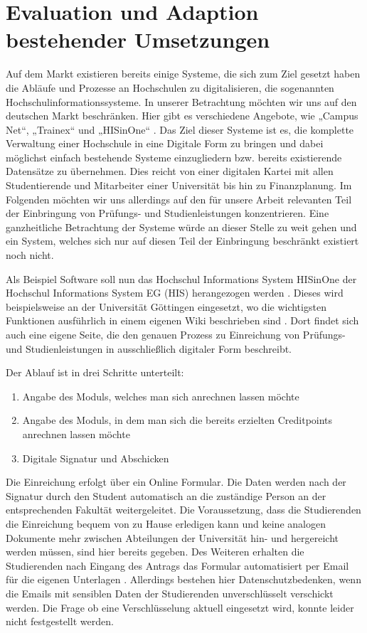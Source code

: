 \section{Evaluation und Adaption bestehender Umsetzungen}

Auf dem Markt existieren bereits einige Systeme, die sich zum Ziel gesetzt haben die Abläufe und Prozesse an Hochschulen zu digitalisieren, die sogenannten Hochschulinformationssysteme. In unserer Betrachtung möchten wir uns auf den deutschen Markt beschränken. Hier gibt es verschiedene Angebote, wie „Campus Net“, „Trainex“ und „HISinOne“ \parencite{wiki_his}. Das Ziel dieser Systeme ist es, die komplette Verwaltung einer Hochschule in eine Digitale Form zu bringen und dabei möglichst einfach bestehende Systeme einzugliedern bzw. bereits existierende Datensätze zu übernehmen. Dies reicht von einer digitalen Kartei mit allen Studentierende und Mitarbeiter einer Universität bis hin zu Finanzplanung. Im Folgenden möchten wir uns allerdings auf den für unsere Arbeit relevanten Teil der Einbringung von Prüfungs- und Studienleistungen konzentrieren. Eine ganzheitliche Betrachtung der Systeme würde an dieser Stelle zu weit gehen und ein System, welches sich nur auf diesen Teil der Einbringung beschränkt existiert noch nicht.

Als Beispiel Software soll nun das Hochschul Informations System HISinOne der Hochschul Informations System EG (HIS) herangezogen werden \parencite{hisde}. Dieses wird beispielsweise an der Universität Göttingen eingesetzt, wo die wichtigsten Funktionen ausführlich in einem eigenen Wiki beschrieben sind \parencite{studit}. Dort findet sich auch eine eigene Seite, die den genauen Prozess zu Einreichung von Prüfungs- und Studienleistungen in ausschließlich digitaler Form beschreibt. 

Der Ablauf ist in drei Schritte unterteilt:

\begin{enumerate}
\item Angabe des Moduls, welches man sich anrechnen lassen möchte
\item Angabe des Moduls, in dem man sich die bereits erzielten Creditpoints anrechnen lassen möchte
\item Digitale Signatur und Abschicken
\end{enumerate}

Die Einreichung erfolgt über ein Online Formular. Die Daten werden nach der Signatur durch den Student automatisch an die zuständige Person an der entsprechenden Fakultät weitergeleitet. Die Voraussetzung, dass die Studierenden die Einreichung bequem von zu Hause erledigen kann und keine analogen Dokumente mehr zwischen Abteilungen der Universität hin- und hergereicht werden müssen, sind hier bereits gegeben. Des Weiteren erhalten die Studierenden nach Eingang des Antrags das Formular automatisiert per Email für die eigenen Unterlagen \parencite{studit_formular}. Allerdings bestehen hier Datenschutzbedenken, wenn die Emails mit sensiblen Daten der Studierenden unverschlüsselt verschickt werden. Die Frage ob eine Verschlüsselung aktuell eingesetzt wird, konnte leider nicht festgestellt  werden.
